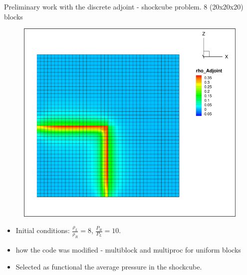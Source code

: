 \documentclass{beamer}
\begin{document}
\begin{frame}
\begin{minipage}[t][1\textheight]{1\textwidth}
\begin{exampleblock}{Preliminary work with the discrete adjoint - shockcube problem. 8 (20x20x20) blocks}
\begin{figure}
{\includegraphics[width=0.65\textheight, trim=0cm 0cm 0 0cm,clip=true]{./figs/rhoAdj_mesh.png}}
\end{figure}
\vspace{-10pt}
\begin{itemize}
\scriptsize
\item Initial conditions: $\frac{\rho_L}{\rho_R} = 8$, $\frac{P_R}{P_L} = 10$. 
\item how the code was modified - multiblock and multiproc for uniform blocks
\item Selected as functional the average pressure in the shockcube.

\end{itemize}

\end{exampleblock}
\end{minipage}

\end{frame}
\end{document}
